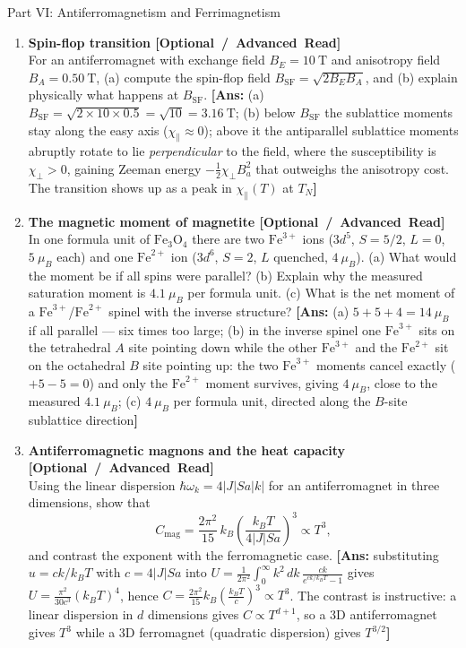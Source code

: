 \documentclass[11pt,a4paper]{article}
\newcommand{\extratag}{\hfill\mbox{\normalfont\footnotesize\sffamily\color{secondary}\textbf{[Optional / Advanced Read]}}}
\begin{document}
\begin{assignmentbox}{Part VI: Antiferromagnetism and Ferrimagnetism}
\begin{enumerate}[label=\textbf{VI.\arabic*.}, leftmargin=*]
    \item \textbf{Spin-flop transition \extratag}\\
    For an antiferromagnet with exchange field $B_E = 10\ \mathrm{T}$ and anisotropy field $B_A = 0.50\ \mathrm{T}$, (a) compute the spin-flop field $B_{\mathrm{SF}} = \sqrt{2B_EB_A}$, and (b) explain physically what happens at $B_{\mathrm{SF}}$.
    \textbf{[Ans:} (a) $B_{\mathrm{SF}} = \sqrt{2\times10\times0.5} = \sqrt{10} = 3.16\ \mathrm{T}$; (b) below $B_{\mathrm{SF}}$ the sublattice moments stay along the easy axis ($\chi_\parallel \approx 0$); above it the antiparallel sublattice moments abruptly rotate to lie \emph{perpendicular} to the field, where the susceptibility is $\chi_\perp > 0$, gaining Zeeman energy $-\frac{1}{2}\chi_\perp B_a^2$ that outweighs the anisotropy cost. The transition shows up as a peak in $\chi_\parallel(T)$ at $T_N$\textbf{]}

    \item \textbf{The magnetic moment of magnetite \extratag}\\
    In one formula unit of $\text{Fe}_3\text{O}_4$ there are two $\text{Fe}^{3+}$ ions ($3d^5$, $S = 5/2$, $L = 0$, $5\ \mu_B$ each) and one $\text{Fe}^{2+}$ ion ($3d^6$, $S = 2$, $L$ quenched, $4\ \mu_B$). (a) What would the moment be if all spins were parallel? (b) Explain why the measured saturation moment is $4.1\ \mu_B$ per formula unit. (c) What is the net moment of a $\text{Fe}^{3+}$/$\text{Fe}^{2+}$ spinel with the inverse structure?
    \textbf{[Ans:} (a) $5 + 5 + 4 = 14\ \mu_B$ if all parallel --- six times too large; (b) in the inverse spinel one $\text{Fe}^{3+}$ sits on the tetrahedral $A$ site pointing down while the other $\text{Fe}^{3+}$ and the $\text{Fe}^{2+}$ sit on the octahedral $B$ site pointing up: the two $\text{Fe}^{3+}$ moments cancel exactly ($+5 - 5 = 0$) and only the $\text{Fe}^{2+}$ moment survives, giving $4\ \mu_B$, close to the measured $4.1\ \mu_B$; (c) $4\ \mu_B$ per formula unit, directed along the $B$-site sublattice direction\textbf{]}

    \item \textbf{Antiferromagnetic magnons and the heat capacity \extratag}\\
    Using the linear dispersion $\hbar\omega_k = 4|J|Sa|k|$ for an antiferromagnet in three dimensions, show that
    \[
    C_{\mathrm{mag}} = \frac{2\pi^2}{15}\,k_B\left(\frac{k_BT}{4|J|Sa}\right)^{3} \propto T^3,
    \]
    and contrast the exponent with the ferromagnetic case.
    \textbf{[Ans:} substituting $u = ck/k_BT$ with $c = 4|J|Sa$ into $U = \frac{1}{2\pi^2}\int_0^\infty k^2\,dk\,\frac{ck}{e^{ck/k_BT}-1}$ gives $U = \frac{\pi^2}{30c^3}(k_BT)^4$, hence $C = \frac{2\pi^2}{15}k_B\left(\frac{k_BT}{c}\right)^3 \propto T^3$. The contrast is instructive: a linear dispersion in $d$ dimensions gives $C\propto T^{d+1}$, so a 3D antiferromagnet gives $T^3$ while a 3D ferromagnet (quadratic dispersion) gives $T^{3/2}$\textbf{]}


\end{enumerate}
\end{assignmentbox}
\end{document}
